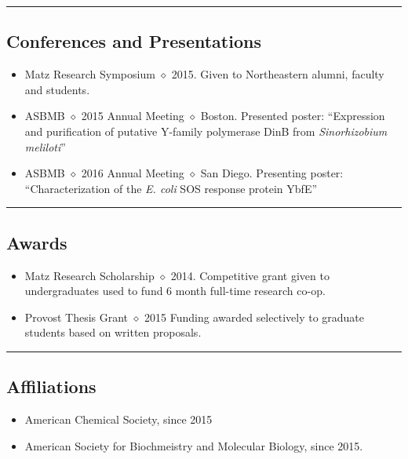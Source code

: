 \documentclass[10pt,letterpaper]{article}
\begin{document}
\hrule
\vspace{-0.4em}
\subsection*{Conferences and Presentations}

\begin{itemize}
  \parskip=0.1em

\item Matz Research Symposium $\diamond$ 2015. Given to Northeastern
  alumni, faculty and students.
\item ASBMB $\diamond$ 2015 Annual Meeting $\diamond$ Boston.
  Presented poster: ``Expression and purification of
  putative Y-family polymerase DinB from \emph{Sinorhizobium meliloti}''
\item ASBMB $\diamond$ 2016 Annual Meeting $\diamond$ San Diego.
  Presenting poster: ``Characterization of the \emph{E. coli} SOS
  response protein YbfE''

\end{itemize}

\hrule
\vspace{-0.4em}
\subsection*{Awards}

\begin{itemize}
  \parskip=0.1em

\item Matz Research Scholarship $\diamond$ 2014. Competitive grant
  given to undergraduates used to fund 6 month full-time research
  co-op.
\item Provost Thesis Grant $\diamond$ 2015 Funding awarded
  selectively to graduate students based on written proposals.

\end{itemize}

\hrule
\vspace{-0.4em}
\subsection*{Affiliations}

\begin{itemize}
  \parskip=0.1em

\item American Chemical Society, since 2015
\item American Society for Biochmeistry and Molecular Biology, since
  2015.

\end{itemize}
\end{document}
